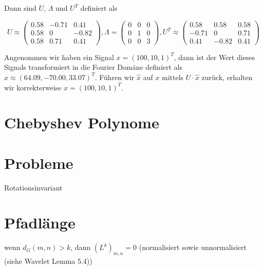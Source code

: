 Dann sind $U$, $\Lambda$ und $U^T$ definiert als

\begin{equation}
  U \approx \begin{pmatrix}
    0.58 & -0.71 & 0.41\\
    0.58 & 0 & -0.82\\
    0.58 & 0.71 & 0.41
  \end{pmatrix},
  \Lambda = \begin{pmatrix}
    0 & 0 & 0\\
    0 & 1 & 0\\
    0 & 0 & 3
  \end{pmatrix},
  U^T \approx \begin{pmatrix}
    0.58 & 0.58 & 0.58\\
    -0.71 & 0 & 0.71\\
    0.41 & -0.82 & 0.41
  \end{pmatrix}
\end{equation}

Angenommen wir haben ein Signal $x = {(100, 10, 1)}^T$, dann ist der Wert dieses Signals transformiert in die Fourier Domäne definiert als $\hat x \approx {(64.09, -70.00, 33.07)}^T$.
Führen wir $\hat x$ auf $x$ mittels $U \cdot \hat x$ zurück, erhalten wir korrekterweise $x = {(100, 10, 1)}^T$.

\section{Chebyshev Polynome}

\section{Probleme}

Rotationsinvariant

\section{Pfadlänge}

wenn $d_G(m,n) > k$, dann ${(L^k)}_{m, n} = 0$
(normalisiert sowie unnormalisiert (siehe Wavelet Lemma 5.4))
